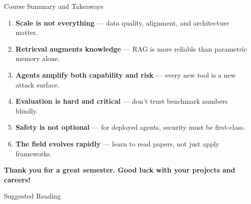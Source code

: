 \documentclass[aspectratio=169,10pt]{beamer}
\begin{document}
\begin{frame}{Course Summary and Takeaways}
  \begin{tcolorbox}[hitbox, title=Key Takeaways]
    \begin{enumerate}
      \item \textbf{Scale is not everything} — data quality, alignment, and architecture matter.
      \item \textbf{Retrieval augments knowledge} — RAG is more reliable than parametric memory alone.
      \item \textbf{Agents amplify both capability and risk} — every new tool is a new attack surface.
      \item \textbf{Evaluation is hard and critical} — don't trust benchmark numbers blindly.
      \item \textbf{Safety is not optional} — for deployed agents, security must be first-class.
      \item \textbf{The field evolves rapidly} — learn to read papers, not just apply frameworks.
    \end{enumerate}
  \end{tcolorbox}
  \vspace{0.3em}
  \textbf{Thank you for a great semester. Good luck with your projects and careers!}
\end{frame}

\begin{frame}[allowframebreaks]{Suggested Reading}
  \nocite{lu2024aiscientist, shen2023hugginggpt, bommasani2021foundation,
          anthropic2024claude3, wei2022emergent}
  
\end{frame}
\end{document}

